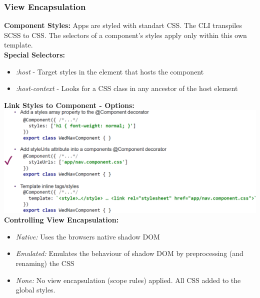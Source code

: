 \subsubsection{View Encapsulation}
\textbf{Component Styles:} Apps are styled with standart CSS.
The CLI transpiles SCSS to CSS.
The selectors of a component's styles apply only within this own template.\\
\textbf{Special Selectors:}
\begin{itemize}
    \item \textit{:host} - Target styles in the element that hosts the component
    \item \textit{:host-context} - Looks for a CSS class in any ancestor of the host element
\end{itemize}
\textbf{Link Styles to Component - Options:}\\
\includegraphics[width=\linewidth]{img/angular_link_styles.png}
\textbf{Controlling View Encapsulation:}
\begin{itemize}
    \item \textit{Native:} Uses the browsers native shadow DOM
    \item \textit{Emulated:} Emulates the behaviour of shadow DOM by preprocessing (and renaming) the CSS
    \item \textit{None:} No view encapsulation (scope rules) applied. All CSS added to the global styles.
\end{itemize}